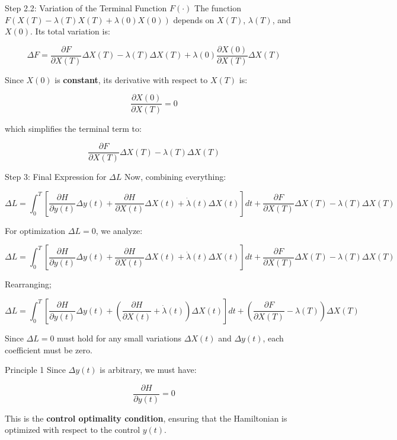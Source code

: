 \documentclass[
  ignorenonframetext,
]{beamer}
\begin{document}
\begin{frame}{Step 2.2: Variation of the Terminal Function \(F(\cdot)\)}
\label{step-2.2-variation-of-the-terminal-function-fcdot}
The function \(F(X(T)- \lambda(T)X(T) + \lambda(0)X(0))\) depends on
\(X(T)\), \(\lambda(T)\), and \(X(0)\). Its total variation is:

\[
\Delta F = \frac{\partial F}{\partial X(T)} \Delta X(T) - \lambda(T) \Delta X(T) + \lambda(0) \frac{\partial X(0)}{\partial X(T)} \Delta X(T)
\]

Since \(X(0)\) is \textbf{constant}, its derivative with respect to
\(X(T)\) is:

\[
\frac{\partial X(0)}{\partial X(T)} = 0
\]

which simplifies the terminal term to:

\[
\frac{\partial F}{\partial X(T)} \Delta X(T) - \lambda(T) \Delta X(T)
\]
\end{frame}

\begin{frame}{Step 3: Final Expression for \(\Delta L\)}
\label{step-3-final-expression-for-delta-l}
Now, combining everything:

\[
\Delta L = \int_0^T\left[ 
\frac{\partial H}{\partial y(t)}\Delta y(t) +
\frac{\partial H}{\partial X(t)}\Delta X(t) +
\dot{\lambda}(t) \Delta X(t)
\right]dt
+ \frac{\partial F}{\partial X(T)}\Delta X(T) - \lambda(T)\Delta X(T)
\]
\end{frame}

\begin{frame}
For optimization \textbf{\(\Delta L = 0\)}, we analyze:

\[
\Delta L = \int_0^T\left[ 
\frac{\partial H}{\partial y(t)}\Delta y(t) +
\frac{\partial H}{\partial X(t)}\Delta X(t) +
\dot{\lambda}(t) \Delta X(t)
\right]dt
+ \frac{\partial F}{\partial X(T)}\Delta X(T) - \lambda(T)\Delta X(T)
\]

Rearranging;

\[
\Delta L = \int_0^T\left[ 
\frac{\partial H}{\partial y(t)}\Delta y(t) +
\left(\frac{\partial H}{\partial X(t)} +
\dot{\lambda}(t)\right)\Delta X(t)
\right]dt
+ \left(\frac{\partial F}{\partial X(T)} - \lambda(T)\right)\Delta X(T)
\]

Since \textbf{\(\Delta L = 0\)} must hold for any small variations
\textbf{\(\Delta X(t)\)} and \textbf{\(\Delta y(t)\)}, each coefficient
must be zero.
\end{frame}

\begin{frame}{Principle 1}
\label{principle-1}
Since \(\Delta y(t)\) is arbitrary, we must have:

\[\frac{\partial H}{\partial y(t)} = 0\]

This is the \textbf{control optimality condition}, ensuring that the
Hamiltonian is optimized with respect to the control \(y(t)\).
\end{frame}
\end{document}
